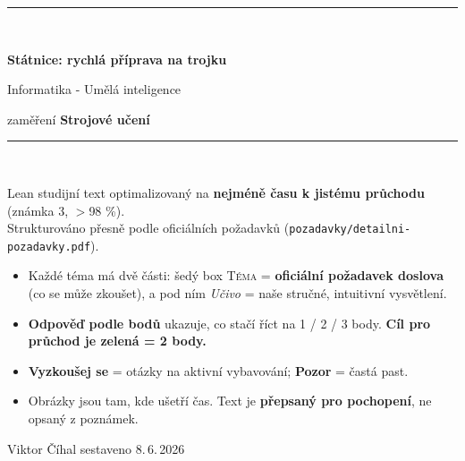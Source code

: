 \documentclass[11pt,a4paper]{article}
\begin{document}
\hypersetup{pageanchor=false}

\begin{titlepage}
\centering
\vspace*{2.2cm}
{\color{mffblue}\rule{\linewidth}{1.2pt}}\\[0.5cm]
{\Huge\bfseries\color{mffblue} Státnice: rychlá příprava na trojku\par}
\vspace{0.4cm}
{\LARGE Informatika - Umělá inteligence\par}
\vspace{0.15cm}
{\Large zaměření \textbf{Strojové učení}\par}
\vspace{0.3cm}
{\color{mffblue}\rule{\linewidth}{1.2pt}}\\[1.0cm]

{\normalsize Lean studijní text optimalizovaný na \textbf{nejméně času k jistému průchodu}
(známka 3, $>$98 \%).\\ Strukturováno přesně podle oficiálních požadavků
(\texttt{pozadavky/detailni-pozadavky.pdf}).\par}

\vfill
\begin{infobox}[title={Jak tento text funguje}]
\begin{itemize}[leftmargin=1.2em]
  \item Každé téma má dvě části: šedý box \textsc{Téma} = \textbf{oficiální požadavek doslova}
  (co se může zkoušet), a pod ním \emph{Učivo} = naše stručné, intuitivní vysvětlení.
  \item \colorbox{defblue!12}{\textbf{Odpověď podle bodů}} ukazuje, co stačí říct na 1 / 2 / 3 body.
  \textbf{Cíl pro průchod je zelená = 2 body.}
  \item \colorbox{orange!18}{\textbf{Vyzkoušej se}} = otázky na aktivní vybavování;
  \colorbox{gapred!12}{\textbf{Pozor}} = častá past.
  \item Obrázky jsou tam, kde ušetří čas. Text je \textbf{přepsaný pro pochopení}, ne opsaný z poznámek.
\end{itemize}
\end{infobox}
\vspace{0.5cm}
{\small Viktor Číhal \textbullet{} sestaveno 8.\,6.\,2026\par}
\end{titlepage}
\hypersetup{pageanchor=true}

\tableofcontents
\clearpage
{}
\end{document}
